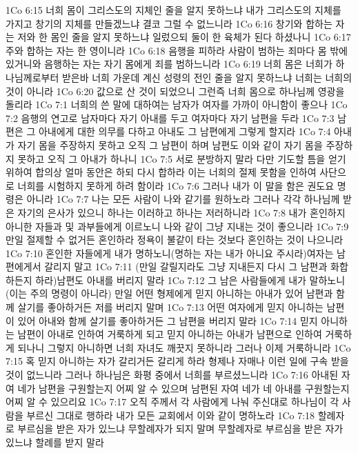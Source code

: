 1Co 6:15  너희 몸이 그리스도의 지체인 줄을 알지 못하느냐 내가 그리스도의 지체를 가지고 창기의 지체를 만들겠느냐 결코 그럴 수 없느니라
1Co 6:16  창기와 합하는 자는 저와 한 몸인 줄을 알지 못하느냐 일렀으되 둘이 한 육체가 된다 하셨나니
1Co 6:17  주와 합하는 자는 한 영이니라
1Co 6:18  음행을 피하라 사람이 범하는 죄마다 몸 밖에 있거니와 음행하는 자는 자기 몸에게 죄를 범하느니라
1Co 6:19  너희 몸은 너희가 하나님께로부터 받은바 너희 가운데 계신 성령의 전인 줄을 알지 못하느냐 너희는 너희의 것이 아니라
1Co 6:20  값으로 산 것이 되었으니 그런즉 너희 몸으로 하나님께 영광을 돌리라
1Co 7:1  너희의 쓴 말에 대하여는 남자가 여자를 가까이 아니함이 좋으나
1Co 7:2  음행의 연고로 남자마다 자기 아내를 두고 여자마다 자기 남편을 두라
1Co 7:3  남편은 그 아내에게 대한 의무를 다하고 아내도 그 남편에게 그렇게 할지라
1Co 7:4  아내가 자기 몸을 주장하지 못하고 오직 그 남편이 하며 남편도 이와 같이 자기 몸을 주장하지 못하고 오직 그 아내가 하나니
1Co 7:5  서로 분방하지 말라 다만 기도할 틈을 얻기 위하여 합의상 얼마 동안은 하되 다시 합하라 이는 너희의 절제 못함을 인하여 사단으로 너희를 시험하지 못하게 하려 함이라
1Co 7:6  그러나 내가 이 말을 함은 권도요 명령은 아니라
1Co 7:7  나는 모든 사람이 나와 같기를 원하노라 그러나 각각 하나님께 받은 자기의 은사가 있으니 하나는 이러하고 하나는 저러하니라
1Co 7:8  내가 혼인하지 아니한 자들과 및 과부들에게 이르노니 나와 같이 그냥 지내는 것이 좋으니라
1Co 7:9  만일 절제할 수 없거든 혼인하라 정욕이 불같이 타는 것보다 혼인하는 것이 나으니라
1Co 7:10  혼인한 자들에게 내가 명하노니(명하는 자는 내가 아니요 주시라)여자는 남편에게서 갈리지 말고
1Co 7:11  (만일 갈릴지라도 그냥 지내든지 다시 그 남편과 화합하든지 하라)남편도 아내를 버리지 말라
1Co 7:12  그 남은 사람들에게 내가 말하노니(이는 주의 명령이 아니라) 만일 어떤 형제에게 믿지 아니하는 아내가 있어 남편과 함께 살기를 좋아하거든 저를 버리지 말며
1Co 7:13  어떤 여자에게 믿지 아니하는 남편이 있어 아내와 함께 살기를 좋아하거든 그 남편을 버리지 말라
1Co 7:14  믿지 아니하는 남편이 아내로 인하여 거룩하게 되고 믿지 아니하는 아내가 남편으로 인하여 거룩하게 되나니 그렇지 아니하면 너희 자녀도 깨끗지 못하니라 그러나 이제 거룩하니라
1Co 7:15  혹 믿지 아니하는 자가 갈리거든 갈리게 하라 형제나 자매나 이런 일에 구속 받을 것이 없느니라 그러나 하나님은 화평 중에서 너희를 부르셨느니라
1Co 7:16  아내된 자여 네가 남편을 구원할는지 어찌 알 수 있으며 남편된 자여 네가 네 아내를 구원할는지 어찌 알 수 있으리요
1Co 7:17  오직 주께서 각 사람에게 나눠 주신대로 하나님이 각 사람을 부르신 그대로 행하라 내가 모든 교회에서 이와 같이 명하노라
1Co 7:18  할례자로 부르심을 받은 자가 있느냐 무할례자가 되지 말며 무할례자로 부르심을 받은 자가 있느냐 할례를 받지 말라
